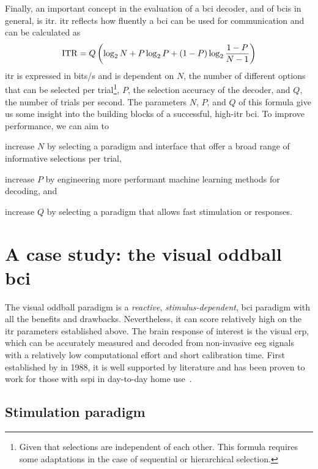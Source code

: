 Finally, an important concept in the evaluation of a \ac{bci} decoder, and of \acp{bci}
in general, is \ac{itr}.
\Ac{itr} reflects how fluently a \ac{bci} can be used for communication and can be
calculated as
\begin{equation}
  \operatorname{ITR} = Q\left(\log_2N+P\log_2P+(1-P)\log_2\frac{1-P}{N-1}\right)
\end{equation}
\Ac{itr} is expressed in bits/s and is dependent on $N$, the number of different options
that can be selected per trial\footnote{Given that selections are independent of each
other. This formula requires some adaptations in the case of sequential or hierarchical
selection.}, $P$, the selection accuracy of the decoder, and $Q$, the number of trials
per second.
The parameters $N$, $P$, and $Q$ of this formula give us some insight into the building
blocks of a successful, high-\ac{itr} \ac{bci}.
To improve performance, we can aim to
\begin{enumerate*}[label={\arabic*})]
\item increase $N$ by selecting a paradigm and interface that offer a broad range of
informative selections per trial,
\item increase $P$ by engineering more performant machine learning methods for decoding,
and
\item increase $Q$ by selecting a paradigm that allows fast stimulation or responses.
\end{enumerate*}

\section{A case study: the visual oddball \acs{bci}}

The visual oddball paradigm is a \emph{reactive}, \emph{stimulus-dependent},
\ac{bci} paradigm with all the benefits and drawbacks.
Nevertheless, it can score relatively high on the \ac{itr} parameters established above.
The brain response of interest is the visual \ac{erp}, which can be accurately measured
and decoded from non-invasive \ac{eeg} signals with a relatively low computational
effort and short calibration time.
First established by \textcite{Farwell1988} in 1988, it is well supported by literature and
has been proven to work for those with \acl{sspi} in day-to-day home use~\cite{Wolpaw2018}.

\subsection{Stimulation paradigm}

